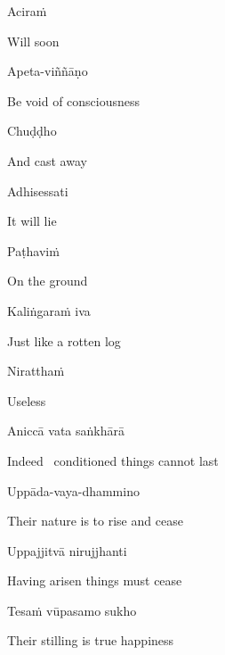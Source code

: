 Aciraṁ

\begin{english}
  Will soon
\end{english}

Apeta-viññāṇo

\begin{english}
  Be void of consciousness
\end{english}

Chuḍḍho

\begin{english}
  And cast away
\end{english}

Adhisessati

\begin{english}
  It will lie
\end{english}

Paṭhaviṁ

\begin{english}
  On the ground
\end{english}

Kaliṅgaraṁ iva

\begin{english}
  Just like a rotten log
\end{english}

Niratthaṁ

\begin{english}
  Useless\makeatletter\hyperlink{endnote105-appendix}\makeatother
\end{english}

\suttaRef{[Dhp 41]}

Aniccā vata saṅkhārā

\begin{english}
  Indeed \breathmark\ conditioned things cannot last
\end{english}

Uppāda-vaya-dhammino

\begin{english}
  Their nature is to rise and cease\makeatletter\hyperlink{endnote106-appendix}\makeatother
\end{english}

Uppajjitvā nirujjhanti

\begin{english}
  Having arisen things must cease
\end{english}

Tesaṁ vūpasamo sukho

\begin{english}
  Their stilling is true happiness
\end{english}

\suttaRef{[Trad]}

